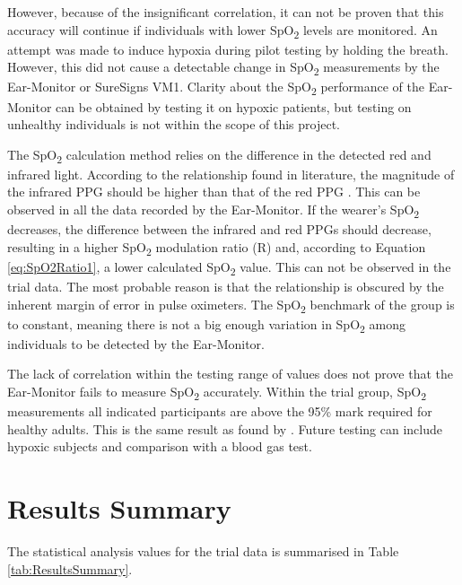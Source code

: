 \medskip

However, because of the insignificant correlation, it can not be proven that this accuracy will continue if individuals with lower SpO\textsubscript{2} levels are monitored. An attempt was made to induce hypoxia during pilot testing by holding the breath. However, this did not cause a detectable change in SpO\textsubscript{2} measurements by the Ear-Monitor or SureSigns VM1. Clarity about the SpO\textsubscript{2} performance of the Ear-Monitor can be obtained by testing it on hypoxic patients, but testing on unhealthy individuals is not within the scope of this project. %

\medskip

The SpO\textsubscript{2} calculation method relies on the difference in the detected red and infrared light. According to the relationship found in literature, the magnitude of the infrared PPG should be higher than that of the red PPG \citep{ti2012application, strogonovsImplementing}. This can be observed in all the data recorded by the Ear-Monitor. If the wearer's SpO\textsubscript{2} decreases, the difference between the infrared and red PPGs should decrease, resulting in a higher SpO\textsubscript{2} modulation ratio (R) and, according to Equation \ref{eq:SpO2Ratio1}, a lower calculated SpO\textsubscript{2} value. This can not be observed in the trial data. The most probable reason is that the relationship is obscured by the inherent margin of error in pulse oximeters. The SpO\textsubscript{2} benchmark of the group is to constant, meaning there is not a big enough variation in SpO\textsubscript{2} among individuals to be detected by the Ear-Monitor.

\medskip

The lack of correlation within the testing range of values does not prove that the Ear-Monitor fails to measure SpO\textsubscript{2} accurately. Within the trial group, SpO\textsubscript{2} measurements all indicated participants are above the 95\% mark required for healthy adults. This is the same result as found by \cite{aziz2006pervasive}. Future testing can include hypoxic subjects and comparison with a blood gas test.

\section{Results Summary}
The statistical analysis values for the trial data is summarised in Table \ref{tab:ResultsSummary}.

